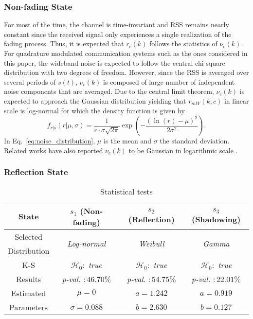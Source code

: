 \documentclass[journal, 10pt, twocolumn, balance]{IEEEtran}
\begin{document}
\subsubsection{Non-fading State}
For most of the time, the channel is time-invariant and RSS remains nearly constant \cite{bultitude1987} since the received signal only experiences a single realization of the fading process. Thus, it is expected that $r_{c}(k)$ follows the statistics of $\nu_c(k)$. For quadrature modulated communication systems such as the ones considered in this paper, the wideband noise is expected to follow the central chi-square distribution with two degrees of freedom. However, since the RSS is averaged over several periods of $s(t)$, $\nu_c(k)$ is composed of large number of independent noise components that are averaged. Due to the central limit theorem, $\nu_c(k)$ is expected to approach the Gaussian distribution yielding that $r_{mW}(k;c)$ in linear scale is log-normal for which the density function is given by
\begin{equation} \label{eq:noise_distribution}
     f_{r \vert s}\left(r \vert \mu, \sigma\right) = \frac{1}{r \cdot \sigma \sqrt{2\pi}}\exp \left(-\frac{(\ln (r) - \mu)^2}{2\sigma^2}\right).
\end{equation}
In Eq.~\eqref{eq:noise_distribution}, $\mu$ is the mean and $\sigma$ the standard deviation. Related works have also reported $\nu_c(k)$ to be Gaussian in logarithmic scale \cite{Zheng2012,Wilson2010,kaltiokallio2014}.


\subsubsection{Reflection State}

\begin{table}[!t]
    \caption{Statistical tests} \centering \renewcommand{\arraystretch}{1.15}\begin{tabular}{|c||c|c|c|}
	\hline\hline
	State & $s_1$ (Non-fading) & $s_2$ (Reflection) & $s_3$ (Shadowing) \\
	\hline
	Selected & \multirow{2}{*}{\emph{Log-normal}} & \multirow{2}{*}{\emph{Weibull}} & \multirow{2}{*}{\emph{Gamma}} \\
	Distribution & & &  \\
	\hline
	K-S & $\mathcal{H}_0:$ \emph{true} & $\mathcal{H}_0:$ \emph{true}  & $\mathcal{H}_0:$ \emph{true}  \\
	Results & \emph{p-val.} $:46.70\%$ & \emph{p-val.} $:54.75\%$ & \emph{p-val.} $:22.01\%$ \\
	\hline
	Estimated & $\mu=0$ & $a = 1.242$ & $a = 0.919$ \\
	Parameters & $\sigma=0.088$ & $b = 2.630$ & $b = 0.127$ \\
	\hline
        \end{tabular}
        \label{table:statistical_tests} \end{table}
\end{document}
